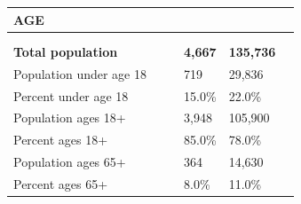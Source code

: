 \documentclass[9pt]{report}
\begin{document}
\vspace{24pt}
\setlength{\tabcolsep}{.01in} %
\begin{tabular}{p{.10in}p{.10in}p{.10in}p{3.7in}>{\hfill}p{.85in}>{\hfill}p{.85in}>{\hfill}p{.85in}>{\hfill}p{.85in}p{0.1in}}
\multicolumn{9}{l}{\parbox{7.1in}{\raggedright{\large{\strut\textbf{AGE}\strut}}}} \\ 
\hline
\multicolumn{4}{l}{\parbox{3.5in}{\raggedright{\textbf{}}}} & \multicolumn{1}{r}{\parbox{.85in}{\strut\raggedleft{\textbf{}\strut}}} & \multicolumn{1}{r}{\parbox{.85in}{\strut\raggedleft{\textbf{}\strut}}} & \multicolumn{1}{r}{\parbox{.85in}{\strut{}}} & \multicolumn{1}{r}{\parbox{.85in}{\strut{}}} & \\ 
\multicolumn{9}{l}{} \\ 
\multicolumn{4}{l}{\parbox{3.5in}{\strut\raggedright{\textbf{Total population}\strut}}} & \textbf{} & \textbf{} & \textbf{4,667} & \textbf{135,736} & \textbf{} \\ 
\multicolumn{4}{l}{\parbox{3.6in}{\strut\raggedright{{Population under age 18}}\strut}} &  &  & 719 & 29,836 & \multicolumn{1}{l}{}  \\ 
\multicolumn{4}{l}{\parbox{3.6in}{\strut\raggedright{{Percent under age 18}}\strut}} &  &  & 15.0\% & 22.0\% & \multicolumn{1}{l}{}  \\ 
\multicolumn{4}{l}{\parbox{3.6in}{\strut\raggedright{{Population ages 18+}}\strut}} &  &  & 3,948 & 105,900 & \multicolumn{1}{l}{}  \\ 
\multicolumn{4}{l}{\parbox{3.6in}{\strut\raggedright{{Percent ages 18+}}\strut}} &  &  & 85.0\% & 78.0\% & \multicolumn{1}{l}{}  \\ 
\multicolumn{4}{l}{\parbox{3.6in}{\strut\raggedright{{Population ages 65+}}\strut}} &  &  & 364 & 14,630 & \multicolumn{1}{l}{}  \\ 
\multicolumn{4}{l}{\parbox{3.6in}{\strut\raggedright{{Percent ages 65+}}\strut}} &  &  & 8.0\% & 11.0\% & \multicolumn{1}{l}{}  \\ 

\end{tabular}
\setlength{\tabcolsep}{6pt} %
\end{document}
